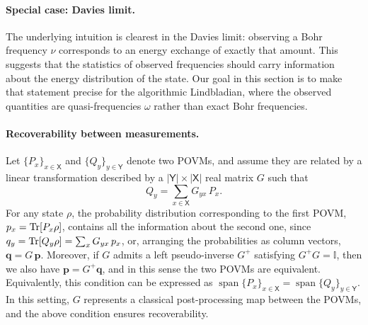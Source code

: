 \documentclass[showpacs,amsmath,amssymb,twocolumn,prx,superscriptaddress,10pt,aps,nofootinbib]{revtex4-2}
\newcommand{\bq}{\mathbf{q}}
\newcommand{\bp}{\mathbf{p}}
\newcommand{\bbI}{\mathbb{I}}
\newcommand{\vspan}{\operatorname{span}}
\begin{document}
\paragraph{Special case: Davies limit.} The underlying intuition is clearest in the Davies limit: observing a Bohr frequency $\nu$ corresponds to an energy exchange of exactly that amount. This suggests that the statistics of observed frequencies should carry information about the energy distribution of the state. Our goal in this section is to make that statement precise for the algorithmic Lindbladian, where the observed quantities are quasi-frequencies $\omega$ rather than exact Bohr frequencies.

\paragraph{Recoverability between measurements.} Let $\{P_x\}_{x \in \mathsf{X}}$ and $\{Q_y\}_{y \in \mathsf{Y}}$ denote two POVMs, and assume they are related by a linear transformation described by a $|\mathsf{Y}| \times |\mathsf{X}|$ real matrix $G$ such that 
\begin{equation}
	Q_y = \sum_{x \in \mathsf{X}} G_{y x}\, P_x .
\end{equation}
For any state $\rho$, the probability distribution corresponding to the first POVM, $p_x = \Tr[P_x \rho]$, contains all the information about the second one, since $q_y = \Tr[Q_y \rho] = \sum_x G_{y x}\, p_x$, or, arranging the probabilities as column vectors, $\bq = G\, \bp$. Moreover, if $G$ admits a left pseudo-inverse $G^+$ satisfying $G^+ G = \bbI$, then we also have $\bp = G^+ \bq$, and in this sense the two POVMs are equivalent. Equivalently, this condition can be expressed as $\vspan\{P_x\}_{x \in \mathsf{X}} = \vspan\{Q_y\}_{y \in \mathsf{Y}}$. In this setting, $G$ represents a classical post-processing map between the POVMs, and the above condition ensures recoverability.
\end{document}
